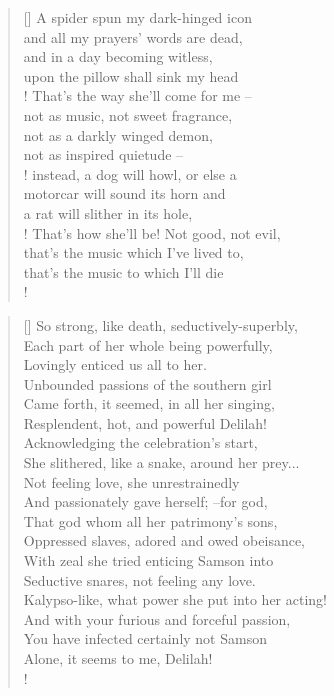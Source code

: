 \documentclass[]{article}
\newcommand{\poemauthorcenter}[1]{\nopagebreak{\centering\footnotesize\textsc{#1}\par}}
\begin{document}
\settowidth{\versewidth}{ It seems my finger, were it pricked. }
\begin{verse}[\versewidth]
A spider spun my dark-hinged icon\\
and all my prayers' words are dead,\\
and in a day becoming witless,\\
upon the pillow shall sink my head\\!
That's the way she'll come for me -- \\
not as music, not sweet fragrance, \\
not as a darkly winged demon, \\
not as inspired quietude -- \\!
instead, a dog will howl, or else a \\
motorcar will sound its horn and \\
a rat will slither in its hole,\\!
That's how she'll be! Not good, not evil,\\
that's the music which I've lived to,\\
that's the music to which I'll die\\!
\end{verse}
\poemauthorcenter{\textit{1922}}
\bigskip \bigskip


\settowidth{\versewidth}{Each par of her whole being powerfully,  }
\begin{verse}[\versewidth]
So strong, like death, seductively-superbly,\\
Each part of her whole being powerfully,\\
Lovingly enticed us all to her.\\
Unbounded passions of the southern girl\\
Came forth, it seemed, in all her singing,\\
Resplendent, hot, and powerful Delilah!\\
Acknowledging the celebration's start,\\
She slithered, like a snake, around her prey...\\
Not feeling love, she unrestrainedly\\
And passionately gave herself; --for god,\\
That god whom all her patrimony's sons,\\
Oppressed slaves, adored and owed obeisance,\\
With zeal she tried enticing Samson into\\
Seductive snares, not feeling any love.\\
Kalypso-like, what power she put into her acting!\\
And with your furious and forceful passion,\\
You have infected certainly not Samson\\
Alone, it seems to me, Delilah!\\!
\end{verse}
\newpage 
\end{document}
